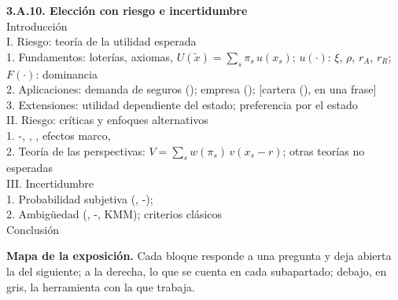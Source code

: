 \documentclass[11pt]{article}
\begin{document}
\begin{esquema}
\textbf{3.A.10. Elección con riesgo e incertidumbre}\\[2pt]
Introducción\\
I. Riesgo: teoría de la utilidad esperada\\
\hspace*{1.5em}1. Fundamentos: loterías, axiomas, $U(\tilde{x})=\sum_s\pi_s\,u(x_s)$; $u(\cdot)$: $\xi$, $\rho$, $r_A$, $r_R$; $F(\cdot)$: dominancia\\
\hspace*{1.5em}2. Aplicaciones: demanda de seguros (); empresa (); [cartera (), en una frase]\\
\hspace*{1.5em}3. Extensiones: utilidad dependiente del estado; preferencia por el estado\\
II. Riesgo: críticas y enfoques alternativos\\
\hspace*{1.5em}1. -, , , efectos marco, \\
\hspace*{1.5em}2. Teoría de las perspectivas: $V=\sum_s w(\pi_s)\,v(x_s-r)$; otras teorías no esperadas\\
III. Incertidumbre\\
\hspace*{1.5em}1. Probabilidad subjetiva (, -); \\
\hspace*{1.5em}2. Ambigüedad (, -, KMM); criterios clásicos\\
Conclusión
\end{esquema}

\begin{anotaciones}
\textbf{Mapa de la exposición.} Cada bloque responde a una pregunta y deja abierta la del siguiente; a la derecha, lo que se cuenta en cada subapartado; debajo, en gris, la herramienta con la que trabaja.
\begin{infografiacaja}
\caption{Mapa del tema: la pregunta de cada bloque, sus subapartados y el hilo que los une}\label{figu:mapa-tema}
\end{infografiacaja}
\end{anotaciones}
\end{document}
